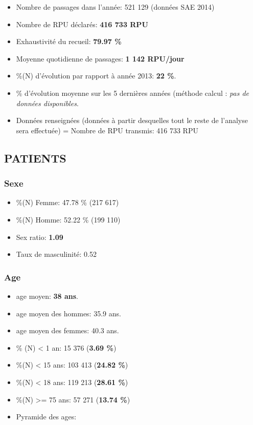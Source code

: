 \documentclass[]{article}
\begin{document}
\begin{itemize}
\itemsep1pt\parskip0pt
\item
  Nombre de passages dans l'année: 521 129 (données SAE 2014)
\item
  Nombre de RPU déclarés: \textbf{416 733 RPU}
\item
  Exhaustivité du recueil: \textbf{79.97 \%}
\item
  Moyenne quotidienne de passages: \textbf{1 142 RPU/jour}
\item
  \%(N) d'évolution par rapport à année 2013: \textbf{22 \%}.
\item
  \% d'évolution moyenne sur les 5 dernières années (méthode calcul :
  \emph{pas de données disponibles}.
\item
  Données renseignées (données à partir desquelles tout le reste de
  l'analyse sera effectuée) = Nombre de RPU transmis: 416 733 RPU
\end{itemize}

\subsection{PATIENTS}\label{patients}

\subsubsection{Sexe}\label{sexe}

\begin{itemize}
\itemsep1pt\parskip0pt
\item
  \%(N) Femme: 47.78 \% (217 617)
\item
  \%(N) Homme: 52.22 \% (199 110)
\item
  Sex ratio: \textbf{1.09}
\item
  Taux de masculinité: 0.52
\end{itemize}

\subsubsection{Age}\label{age}

\begin{itemize}
\item
  age moyen: \textbf{38 ans}.
\item
  age moyen des hommes: 35.9 ans.
\item
  age moyen des femmes: 40.3 ans.
\item
  \% (N) \textless{} 1 an: 15 376 (\textbf{3.69 \%})
\item
  \%(N) \textless{} 15 ans: 103 413 (\textbf{24.82 \%})
\item
  \%(N) \textless{} 18 ans: 119 213 (\textbf{28.61 \%})
\item
  \%(N) \textgreater{}= 75 ans: 57 271 (\textbf{13.74 \%})
\item
  Pyramide des ages:
\end{itemize}
\end{document}
